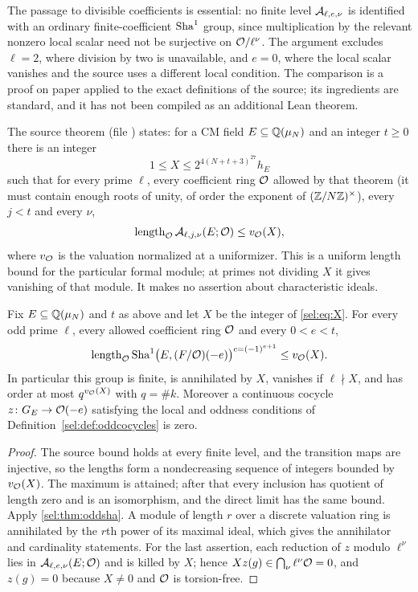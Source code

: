 The passage to divisible coefficients is essential: no finite level
$\mathcal{A}_{\ell,e,\nu}$ is identified with an ordinary finite-coefficient
$\operatorname{Sha}^1$ group, since multiplication by the relevant nonzero local
scalar need not be surjective on $\mathcal{O}/\ell^\nu$. The argument excludes
$\ell=2$, where division by two is unavailable, and $e=0$, where the local
scalar vanishes and the source uses a different local condition. The
comparison is a proof on paper applied to the exact definitions of the
source; its ingredients are standard, and it has not been compiled as an
additional Lean theorem.

The source theorem  (file
) states: for a CM field
$E\subseteq\mathbb{Q}(\mu_N)$ and an integer $t\ge0$ there is an integer
\begin{equation}\label{sel:eq:X}
 1\le X\le2^{4(N+t+3)^{27}}h_E
\end{equation}
such that for every prime $\ell$, every coefficient ring $\mathcal{O}$ allowed by
that theorem (it must contain enough roots of unity, of order the exponent
of $(\mathbb{Z}/N\mathbb{Z})^\times$), every $j<t$ and every $\nu$,
\[
 \operatorname{length}_{\mathcal{O}}\mathcal{A}_{\ell,j,\nu}(E;\mathcal{O})\le v_{\mathcal{O}}(X),
\]
where $v_{\mathcal{O}}$ is the valuation normalized at a uniformizer. This is a
uniform length bound for the particular formal module; at primes not
dividing $X$ it gives vanishing of that module. It makes no assertion about
characteristic ideals.

\begin{corollary}\label{sel:cor:oddshabound}
Fix $E\subseteq\mathbb{Q}(\mu_N)$ and $t$ as above and let $X$ be the integer of
\eqref{sel:eq:X}. For every odd prime $\ell$, every allowed coefficient ring
$\mathcal{O}$ and every $0<e<t$,
\[
 \operatorname{length}_{\mathcal{O}}\operatorname{Sha}^1\bigl(E,(F/\mathcal{O})(-e)\bigr)^{c=(-1)^{e+1}}
 \le v_{\mathcal{O}}(X).
\]
In particular this group is finite, is annihilated by $X$, vanishes if
$\ell\nmid X$, and has order at most $q^{v_{\mathcal{O}}(X)}$ with $q=\#k$.
Moreover a continuous cocycle $z\colon G_E\to\mathcal{O}(-e)$ satisfying the local
and oddness conditions of Definition~\ref{sel:def:oddcocycles} is zero.
\end{corollary}

\begin{proof}
The source bound holds at every finite level, and the transition maps are
injective, so the lengths form a nondecreasing sequence of integers bounded
by $v_{\mathcal{O}}(X)$. The maximum is attained; after that every inclusion has
quotient of length zero and is an isomorphism, and the direct limit has the
same bound. Apply \cref{sel:thm:oddsha}. A module of length $r$ over a
discrete valuation ring is annihilated by the $r$th power of its maximal
ideal, which gives the annihilator and cardinality statements. For the last
assertion, each reduction of $z$ modulo $\ell^\nu$ lies in
$\mathcal{A}_{\ell,e,\nu}(E;\mathcal{O})$ and is killed by $X$; hence
$Xz(g)\in\bigcap_\nu\ell^\nu\mathcal{O}=0$, and $z(g)=0$ because $X\ne0$ and $\mathcal{O}$
is torsion-free.
\end{proof}

